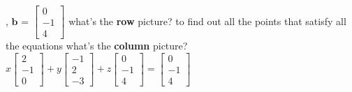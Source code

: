 \documentclass[12pt, a4paper]{article}
\begin{document}
, ${\mathbf{b}}$ =
\begin{math} 
\begin{bmatrix}
	0 \\
	-1\\
	4
\end{bmatrix}
\end{math}
\vspace{14pt}
\newline
what's the {\textcolor{anhao-scarlet}{\bf{row}}} picture?
\newline
{\textcolor{anhao-purple}{to find out all the points that satisfy all the equations}}
\newline
what's the {\textcolor{anhao-scarlet}{\bf{column}}} picture?
\newline
\begin{math}
x
\begin{bmatrix}
	2 \\
	-1\\
	0
\end{bmatrix}
 + y
\begin{bmatrix}
	-1 \\
	2\\
	-3
\end{bmatrix}
 + z
\begin{bmatrix}
	0 \\
	-1\\
	4
\end{bmatrix}
 = 
\begin{bmatrix}
	0 \\
	-1\\
	4
\end{bmatrix}
\end{math}
\vspace{14pt}
\newline
\end{document}
